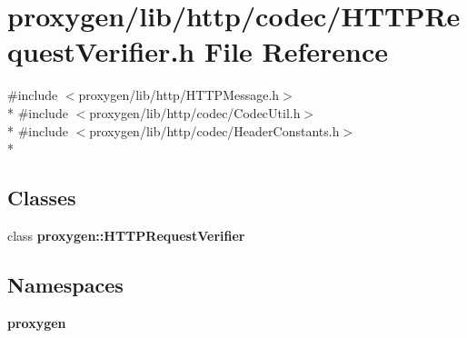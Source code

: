 \section{proxygen/lib/http/codec/\+H\+T\+T\+P\+Request\+Verifier.h File Reference}
\label{HTTPRequestVerifier_8h}
{\ttfamily \#include $<$proxygen/lib/http/\+H\+T\+T\+P\+Message.\+h$>$}\\*
{\ttfamily \#include $<$proxygen/lib/http/codec/\+Codec\+Util.\+h$>$}\\*
{\ttfamily \#include $<$proxygen/lib/http/codec/\+Header\+Constants.\+h$>$}\\*
\subsection*{Classes}
\begin{DoxyCompactItemize}
\item 
class {\bf proxygen\+::\+H\+T\+T\+P\+Request\+Verifier}
\end{DoxyCompactItemize}
\subsection*{Namespaces}
\begin{DoxyCompactItemize}
\item 
 {\bf proxygen}
\end{DoxyCompactItemize}

